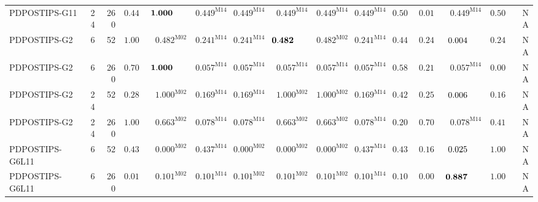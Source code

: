 \documentclass[10pt,a4paper]{article}
\begin{document}
\begin{longtable}{@{}lrrrrrrrrrrrrrr@{}}
PDPOSTIPS-G11 & 24 & 260 & $\mathbf{0.449}$ & $\mathbf{1.000}\hphantom{^{\mathrm{M00}}}$ & $\mathbf{0.449}^{\mathrm{M14}}$ & $\mathbf{0.449}^{\mathrm{M14}}$ & $\mathbf{0.449}^{\mathrm{M14}}$ & $\mathbf{0.449}^{\mathrm{M14}}$ & $\mathbf{0.449}^{\mathrm{M14}}$ & $\mathbf{0.506}$ & $0.012$ & $\mathbf{0.449}^{\mathrm{M14}}$ & $\mathbf{0.506}$ & \textsc{NA} \\
PDPOSTIPS-G2 & 6 & 52 & $\mathbf{1.000}$ & $\mathbf{0.482}^{\mathrm{M02}}$ & $\mathbf{0.241}^{\mathrm{M14}}$ & $\mathbf{0.241}^{\mathrm{M14}}$ & $\mathbf{0.482}\hphantom{^{\mathrm{M00}}}$ & $\mathbf{0.482}^{\mathrm{M02}}$ & $\mathbf{0.241}^{\mathrm{M14}}$ & $\mathbf{0.445}$ & $\mathbf{0.245}$ & $0.004\hphantom{^{\mathrm{M00}}}$ & $\mathbf{0.245}$ & \textsc{NA} \\
PDPOSTIPS-G2 & 6 & 260 & $\mathbf{0.701}$ & $\mathbf{1.000}\hphantom{^{\mathrm{M00}}}$ & $0.057^{\mathrm{M14}}$ & $0.057^{\mathrm{M14}}$ & $0.057^{\mathrm{M14}}$ & $0.057^{\mathrm{M14}}$ & $0.057^{\mathrm{M14}}$ & $\mathbf{0.581}$ & $\mathbf{0.215}$ & $0.057^{\mathrm{M14}}$ & $0.001$ & \textsc{NA} \\
PDPOSTIPS-G2 & 24 & 52 & $\mathbf{0.283}$ & $\mathbf{1.000}^{\mathrm{M02}}$ & $\mathbf{0.169}^{\mathrm{M14}}$ & $\mathbf{0.169}^{\mathrm{M14}}$ & $\mathbf{1.000}^{\mathrm{M02}}$ & $\mathbf{1.000}^{\mathrm{M02}}$ & $\mathbf{0.169}^{\mathrm{M14}}$ & $\mathbf{0.426}$ & $\mathbf{0.255}$ & $0.006\hphantom{^{\mathrm{M00}}}$ & $\mathbf{0.169}$ & \textsc{NA} \\
PDPOSTIPS-G2 & 24 & 260 & $\mathbf{1.000}$ & $\mathbf{0.663}^{\mathrm{M02}}$ & $0.078^{\mathrm{M14}}$ & $0.078^{\mathrm{M14}}$ & $\mathbf{0.663}^{\mathrm{M02}}$ & $\mathbf{0.663}^{\mathrm{M02}}$ & $0.078^{\mathrm{M14}}$ & $\mathbf{0.200}$ & $\mathbf{0.701}$ & $0.078^{\mathrm{M14}}$ & $\mathbf{0.419}$ & \textsc{NA} \\
PDPOSTIPS-G6L11 & 6 & 52 & $\mathbf{0.437}$ & $0.000^{\mathrm{M02}}$ & $\mathbf{0.437}^{\mathrm{M14}}$ & $0.000^{\mathrm{M02}}$ & $0.000^{\mathrm{M02}}$ & $0.000^{\mathrm{M02}}$ & $\mathbf{0.437}^{\mathrm{M14}}$ & $\mathbf{0.437}$ & $\mathbf{0.162}$ & $0.025\hphantom{^{\mathrm{M00}}}$ & $\mathbf{1.000}$ & \textsc{NA} \\
PDPOSTIPS-G6L11 & 6 & 260 & $0.018$ & $\mathbf{0.101}^{\mathrm{M02}}$ & $\mathbf{0.101}^{\mathrm{M14}}$ & $\mathbf{0.101}^{\mathrm{M02}}$ & $\mathbf{0.101}^{\mathrm{M02}}$ & $\mathbf{0.101}^{\mathrm{M02}}$ & $\mathbf{0.101}^{\mathrm{M14}}$ & $\mathbf{0.101}$ & $0.000$ & $\mathbf{0.887}\hphantom{^{\mathrm{M00}}}$ & $\mathbf{1.000}$ & \textsc{NA} \\

\end{longtable}
\end{document}
